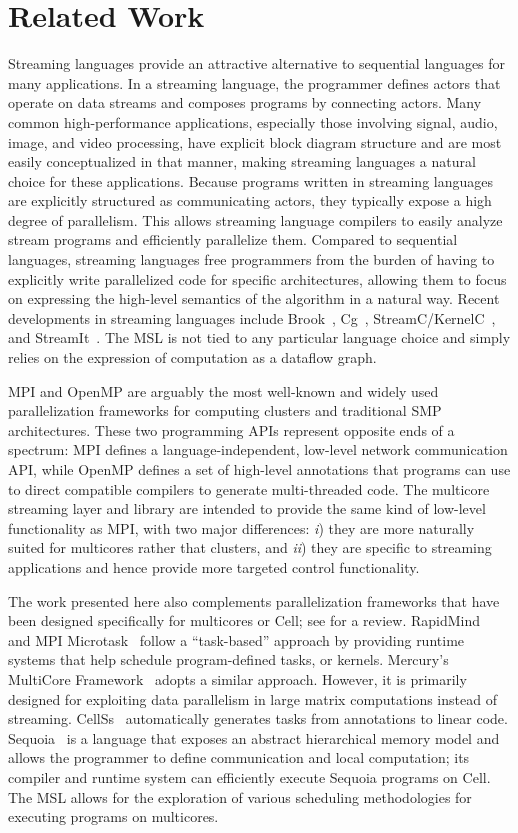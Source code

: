 \section{Related Work}\label{ch:bg}

Streaming languages provide an attractive alternative to sequential
languages for many applications. In a streaming language, the
programmer defines actors that operate on data streams and composes
programs by connecting actors. Many common high-performance
applications, especially those involving signal, audio, image, and
video processing, have explicit block diagram structure and are most
easily conceptualized in that manner, making streaming languages a
natural choice for these applications.
Because programs written in streaming languages are explicitly
structured as communicating actors, they typically expose a high
degree of parallelism. This allows streaming language compilers to
easily analyze stream programs and efficiently parallelize
them. Compared to sequential languages, streaming languages free
programmers from the burden of having to explicitly write parallelized
code for specific architectures, allowing them to focus on expressing
the high-level semantics of the algorithm in a natural way.
Recent developments in streaming languages include Brook~\cite{brook},
Cg~\cite{cg}, StreamC/KernelC~\cite{streamc}, and StreamIt~\cite{streamitweb}.
The MSL is not tied to any particular language choice and simply
relies on the expression of computation as a dataflow graph.
 
MPI and OpenMP are arguably the most well-known and widely used
parallelization frameworks for computing clusters and traditional SMP
architectures. These two programming APIs represent opposite ends of a
spectrum: MPI defines a language-independent, low-level network
communication API, while OpenMP defines a set of  high-level
annotations that programs can use to direct compatible compilers to
generate multi-threaded code.  The multicore streaming layer and
library are intended to provide the same kind of low-level
functionality as MPI, with two major differences: \emph{i}) they are
more naturally suited for multicores rather that clusters, and
\emph{ii}) they are specific to streaming applications and hence provide
more targeted control functionality.

The work presented here also complements parallelization frameworks
that have been designed specifically for multicores or Cell; see
\cite{cell:pf} for a review. RapidMind~\cite{rapidmind} and MPI
Microtask~\cite{mpimicrotask} follow a ``task-based'' approach by
providing runtime systems that help schedule program-defined tasks, or
kernels. Mercury's MultiCore Framework~\cite{mcf} adopts a similar
approach. However, it is primarily designed for exploiting data
parallelism in large matrix computations instead of streaming.
CellSs~\cite{cellss} automatically generates tasks from
annotations to linear code. Sequoia~\cite{sequoia} is a language that
exposes an abstract hierarchical memory model and allows the
programmer to define communication and local computation; its compiler
and runtime system can efficiently execute Sequoia programs on
Cell. The MSL allows for the exploration of various scheduling
methodologies for executing programs on multicores.

